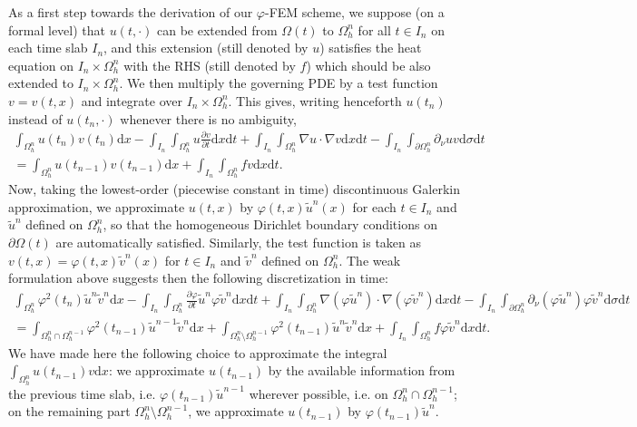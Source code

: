 \documentclass[11pt,a4paper]{article}
\theoremstyle{plain}
\theoremstyle{definition}
\theoremstyle{remark}
\numberwithin{equation}{section}
\newcommand{\dx}{\mathrm{d}x}
\newcommand{\dsigma}{\mathrm{d}\sigma}
\newcommand{\dt}{\mathrm{d}t}
\begin{document}
As a first step towards the derivation of our $\varphi$-FEM scheme,
we suppose (on a formal level) that $u (t, \cdot)$ can be extended
from $\Omega (t)$ to $\Omega_h^n$ {for all $t\in I_n$ on each time slab $I_n$}, and this extension (still denoted by $u$) satisfies the heat equation on $I_n \times \Omega_h^n$ with the RHS (still denoted by $f$) which should be also extended to $I_n \times \Omega_h^n$. We then multiply the governing PDE by a test function $v = v (t, x)$ and integrate over $I_n \times \Omega_h^n$. This gives, {writing henceforth $u(t_n)$ instead of $u(t_n,\cdot)$ whenever there is no ambiguity,}
\begin{multline*} \int_{\Omega_h^n} u (t_n) v (t_n) \dx - \int_{I_n} \int_{\Omega_h^n} u
\frac{\partial v}{\partial t} \dx \dt + \int_{I_n}
\int_{\Omega_h^n} \nabla u \cdot \nabla v \dx \dt - \int_{I_n}
\int_{\partial \Omega_h^n} \partial_{\nu}{u} v \dsigma
\dt \\
 = \int_{\Omega_h^n} u (t_{n - 1}) v (t_{n - 1}) \dx + \int_{I_n} \int_{\Omega_h^n} fv \dx \dt.
\end{multline*}
Now, taking the lowest-order (piecewise constant in time) discontinuous Galerkin approximation, we approximate $u(t, x)$ by $\varphi (t, x)  \tilde{u}^n (x)$ for each $t \in I_n$ and $\tilde{u}^n$ defined on $\Omega_h^n$, so that the homogeneous Dirichlet boundary conditions on $\partial\Omega(t)$ are automatically satisfied. Similarly, the test function is taken as $v (t, x) = \varphi (t, x)\tilde{v}^n(x)$ for $t \in I_n$ and $\tilde{v}^n$ defined on $\Omega_h^n$. The weak formulation above suggests then the following discretization in time:
\begin{multline*}	%
	\int_{\Omega_h^n} \varphi^2 (t_n)  \tilde{u}^n  \tilde{v}^n
	\dx - \int_{I_n} \int_{\Omega_h^n} \frac{\partial \varphi}{\partial t}  \tilde{u}^n \varphi  \tilde{v}^n \dx \dt + \int_{I_n} \int_{\Omega_h^n}
	\nabla (\varphi \tilde{u}^n) \cdot \nabla (\varphi \tilde{v}^n) \dx \dt -
	\int_{I_n} \int_{\partial \Omega_h^n} \partial_{\nu}{(\varphi\tilde{u}^n)}  \varphi \tilde{v}^n  \dsigma \dt
\\
  = \int_{\Omega_h^n \cap \Omega_h^{n - 1}} \varphi^2 (t_{n - 1})  \tilde{u}^{n
	- 1}  \tilde{v}^n \dx + \int_{\Omega_h^n \setminus \Omega_h^{n - 1}} \varphi^2 (t_{n - 1})  \tilde{u}^n  \tilde{v}^n \dx + \int_{I_n}
\int_{\Omega_h^n} f \varphi \tilde{v}^n \dx \dt.
\end{multline*}
We have made here the following choice to approximate the integral
$\int_{\Omega_h^n} u (t_{n - 1}) v \dx$: we approximate $u (t_{n - 1})$ by the available information from the previous
time slab, i.e. $\varphi (t_{n - 1})  \tilde{u}^{n - 1}$ wherever possible, i.e. on $\Omega_h^n \cap \Omega_h^{n - 1}$; on the remaining part $\Omega_h^n\setminus \Omega_h^{n - 1}$, we approximate $u (t_{n - 1})$ by $\varphi (t_{n - 1})  \tilde{u}^n$.
\end{document}
